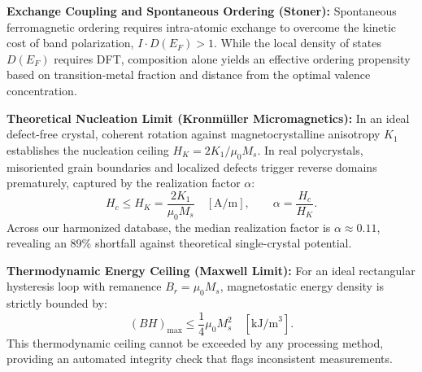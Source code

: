 \documentclass[10pt,a4paper]{article}
\begin{document}
\noindent\textbf{Exchange Coupling and Spontaneous Ordering (Stoner):} Spontaneous ferromagnetic ordering requires intra-atomic exchange to overcome the kinetic cost of band polarization, $I \cdot D(E_F) > 1$. While the local density of states $D(E_F)$ requires DFT, composition alone yields an effective ordering propensity based on transition-metal fraction and distance from the optimal valence concentration.

\noindent\textbf{Theoretical Nucleation Limit (Kronmüller Micromagnetics):} In an ideal defect-free crystal, coherent rotation against magnetocrystalline anisotropy $K_1$ establishes the nucleation ceiling $H_K = 2K_1 / \mu_0 M_s$. In real polycrystals, misoriented grain boundaries and localized defects trigger reverse domains prematurely, captured by the realization factor $\alpha$:
\begin{equation}
H_c \le H_K = \frac{2K_1}{\mu_0 M_s} \quad [\text{A/m}], \qquad \alpha = \frac{H_c}{H_K}.
\end{equation}
Across our harmonized database, the median realization factor is $\alpha \approx 0.11$, revealing an 89\% shortfall against theoretical single-crystal potential.

\noindent\textbf{Thermodynamic Energy Ceiling (Maxwell Limit):} For an ideal rectangular hysteresis loop with remanence $B_r = \mu_0 M_s$, magnetostatic energy density is strictly bounded by:
\begin{equation}
(BH)_{\max} \le \frac{1}{4} \mu_0 M_s^2 \quad [\text{kJ/m}^3].
\end{equation}
This thermodynamic ceiling cannot be exceeded by any processing method, providing an automated integrity check that flags inconsistent measurements.
\end{document}
